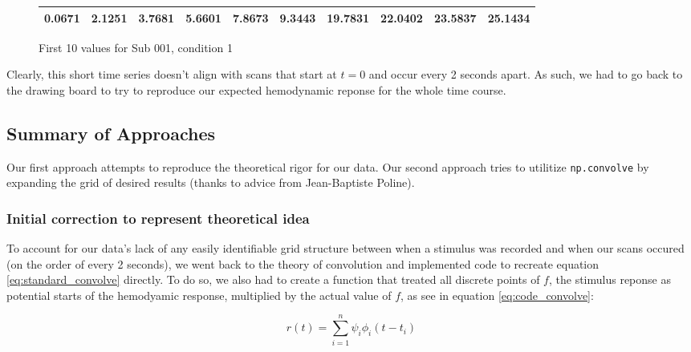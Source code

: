 \documentclass[11pt]{article}
\begin{document}
\vspace{5mm}

\begin{figure}[ht]
\begin{center}
\begin{tabular}{|cccccccccc|}
  \hline
0.0671 &
2.1251 &
3.7681 &
5.6601 &
7.8673 &
9.3443 &
19.7831 &
22.0402 &
23.5837 &
25.1434 \\
 \hline

  \end{tabular}
   \caption{First 10 values for Sub 001, condition 1}
  \label{table:cond1}
\end{center}
\end{figure}
 
Clearly, this short time series doesn't align with scans that start at 
$t=0$ and occur every 2 seconds apart. As such, we had to go back to the 
drawing board to try to reproduce our expected hemodynamic reponse for the 
whole time course.



\subsection{Summary of Approaches}
Our first approach attempts to reproduce the theoretical rigor for our data. 
Our second approach tries to utilitize \texttt{np.convolve} by expanding the 
grid of desired results (thanks to advice from Jean-Baptiste Poline).




\subsubsection{Initial correction to represent theoretical idea}
To account for our data's lack of any easily identifiable grid structure 
between when a stimulus was recorded and when our scans occured (on the 
order of every 2 seconds), we went back to the theory of convolution and 
implemented code to recreate equation \ref{eq:standard_convolve} directly. 
To do so, we also had to create a function that treated all discrete points 
of $f$, the stimulus reponse as potential starts of the hemodyamic response, 
multiplied by the actual value of $f$, as see in equation 
\ref{eq:code_convolve}:

\begin{equation} \label{eq:code_convolve}
r(t)= \sum_{i=1}^n \psi_{i} \phi_{i}(t-t_i)
\end{equation}
\end{document}

